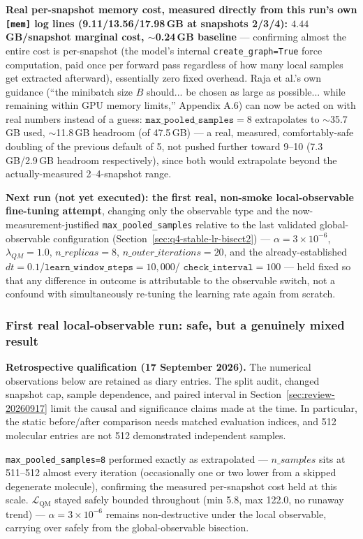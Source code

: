 \documentclass[11pt]{article}
\begin{document}
\textbf{Real per-snapshot memory cost, measured directly from this run's
own \texttt{[mem]} log lines (9.11/13.56/17.98\,GB at snapshots 2/3/4):
$4.44$\,GB/snapshot marginal cost, $\sim$0.24\,GB baseline} --- confirming
almost the entire cost is per-snapshot (the model's internal
\texttt{create\_graph=True} force computation, paid once per forward pass
regardless of how many local samples get extracted afterward), essentially
zero fixed overhead. Raja et al.'s own guidance (``the minibatch size $B$
should... be chosen as large as possible... while remaining within GPU
memory limits,'' Appendix A.6) can now be acted on with real numbers
instead of a guess: $\texttt{max\_pooled\_samples}=8$ extrapolates to
$\sim$35.7\,GB used, $\sim$11.8\,GB headroom (of 47.5\,GB) --- a real,
measured, comfortably-safe doubling of the previous default of 5, not
pushed further toward 9--10 (7.3\,GB/2.9\,GB headroom respectively),
since both would extrapolate beyond the actually-measured 2--4-snapshot
range.

\textbf{Next run (not yet executed): the first real, non-smoke local-observable
fine-tuning attempt}, changing only the observable type and the
now-measurement-justified \texttt{max\_pooled\_samples} relative to the
last validated global-observable configuration
(Section~\ref{sec:q4-stable-lr-bisect2}) --- $\alpha=3\times10^{-6}$,
$\lambda_{QM}=1.0$, $n\_replicas=8$, $n\_outer\_iterations=20$, and the
already-established $dt=0.1$/$\texttt{learn\_window\_steps}=10{,}000$/
$\texttt{check\_interval}=100$ --- held fixed so that any difference in
outcome is attributable to the observable switch, not a confound with
simultaneously re-tuning the learning rate again from scratch.

\subsubsection{First real local-observable run: safe, but a genuinely mixed result}
\noindent\textbf{Retrospective qualification (17 September 2026).}
The numerical observations below are retained as diary entries. The split
audit, changed snapshot cap, sample dependence, and paired interval in
Section~\ref{sec:review-20260917} limit the causal and significance claims
made at the time. In particular, the static before/after comparison needs
matched evaluation indices, and 512 molecular entries are not 512
demonstrated independent samples.
\label{sec:q4-stable-local-v1}

\texttt{max\_pooled\_samples=8} performed exactly as extrapolated ---
$n\_samples$ sits at 511--512 almost every iteration (occasionally one or
two lower from a skipped degenerate molecule), confirming the measured
per-snapshot cost held at this scale. $\mathcal{L}_{\text{QM}}$ stayed
safely bounded throughout (min 5.8, max 122.0, no runaway trend) ---
$\alpha=3\times10^{-6}$ remains non-destructive under the local observable,
carrying over safely from the global-observable bisection.
\end{document}
